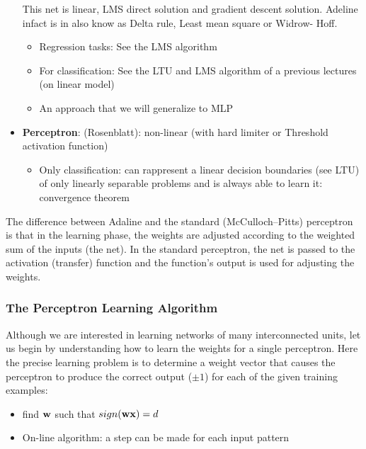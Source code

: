 \documentclass[../main.tex]{subfiles}
\begin{document}
\begin{itemize}
    This net is linear,  LMS direct solution and gradient descent solution. Adeline infact is in also know as Delta rule, Least mean square or Widrow- Hoff.
    \begin{itemize}
        \item Regression tasks: See the LMS algorithm
        \item For classification: See the LTU and LMS algorithm of a previous lectures (on linear model)
        \item An approach that we will generalize to MLP
    \end{itemize}
    \item \textbf{Perceptron}: (Rosenblatt): non-linear (with hard limiter or Threshold activation function)
    \begin{itemize}
        \item Only classification: can rappresent a linear decision boundaries (see LTU) of only  linearly separable problems and is always able to learn it: convergence theorem
    \end{itemize}
\end{itemize}

The difference between Adaline and the standard (McCulloch–Pitts) perceptron is that in the learning phase, the weights are adjusted according to the weighted sum of the inputs (the net). In the standard perceptron, the net is passed to the activation (transfer) function and the function's output is used for adjusting the weights.

\subsubsection{The Perceptron Learning Algorithm}
Although we are interested in learning networks of many interconnected units, let us begin by understanding how to learn the weights for a single perceptron. Here the precise learning problem is to determine a weight vector that causes the perceptron to produce the correct output ($\pm 1$) for each of the given training examples:
\begin{itemize}
    \item find $\bold{w}$ such that $sign(\bold{wx})=d$
    \item On-line algorithm: a step can be made for each input pattern
\end{itemize}
\end{document}
